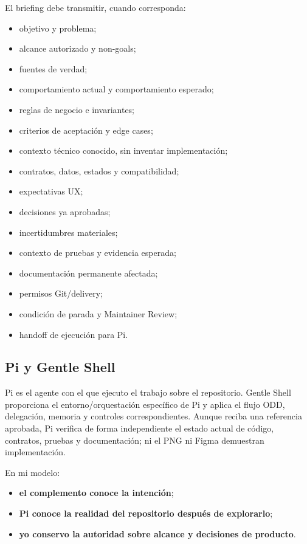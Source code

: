 \documentclass[11pt,a4paper]{article}
\begin{document}
El briefing debe transmitir, cuando corresponda:

\begin{itemize}
    \item objetivo y problema;
    \item alcance autorizado y non-goals;
    \item fuentes de verdad;
    \item comportamiento actual y comportamiento esperado;
    \item reglas de negocio e invariantes;
    \item criterios de aceptación y edge cases;
    \item contexto técnico conocido, sin inventar implementación;
    \item contratos, datos, estados y compatibilidad;
    \item expectativas UX;
    \item decisiones ya aprobadas;
    \item incertidumbres materiales;
    \item contexto de pruebas y evidencia esperada;
    \item documentación permanente afectada;
    \item permisos Git/delivery;
    \item condición de parada y Maintainer Review;
    \item handoff de ejecución para Pi.
\end{itemize}

\subsection{Pi y Gentle Shell}

Pi es el agente con el que ejecuto el trabajo sobre el repositorio. Gentle Shell proporciona el entorno/orquestación específico de Pi y aplica el flujo ODD, delegación, memoria y controles correspondientes. Aunque reciba una referencia aprobada, Pi verifica de forma independiente el estado actual de código, contratos, pruebas y documentación; ni el PNG ni Figma demuestran implementación.

En mi modelo:

\begin{itemize}
    \item \textbf{el complemento conoce la intención};
    \item \textbf{Pi conoce la realidad del repositorio después de explorarlo};
    \item \textbf{yo conservo la autoridad sobre alcance y decisiones de producto}.
\end{itemize}
\end{document}
